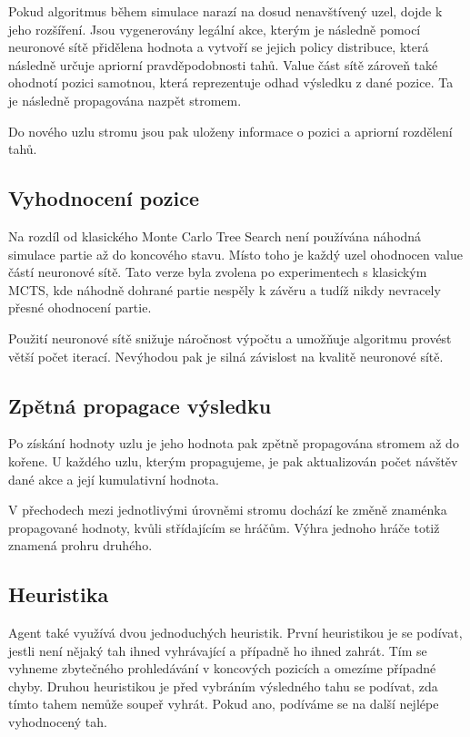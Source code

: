 Pokud algoritmus během simulace narazí na dosud nenavštívený uzel, dojde k jeho rozšíření. Jsou vygenerovány legální akce, kterým je následně pomocí 
neuronové sítě přidělena hodnota a vytvoří se jejich policy distribuce, která následně určuje apriorní pravděpodobnosti tahů. Value část sítě 
zároveň také ohodnotí pozici samotnou, která reprezentuje odhad výsledku z dané pozice. Ta je následně propagována nazpět stromem.

Do nového uzlu stromu jsou pak uloženy informace o pozici a apriorní rozdělení tahů.

\subsection{Vyhodnocení pozice}

Na rozdíl od klasického Monte Carlo Tree Search není používána náhodná simulace partie až do koncového stavu. Místo toho je každý uzel ohodnocen 
value částí neuronové sítě. Tato verze byla zvolena po experimentech s klasickým MCTS, kde náhodně dohrané partie nespěly k závěru a tudíž
nikdy nevracely přesné ohodnocení partie.

Použití neuronové sítě snižuje náročnost výpočtu a umožňuje algoritmu provést větší počet iterací. Nevýhodou pak je silná závislost na kvalitě
neuronové sítě. 

\subsection{Zpětná propagace výsledku}

Po získání hodnoty uzlu je jeho hodnota pak zpětně propagována stromem až do kořene. U každého uzlu, kterým propagujeme, je pak aktualizován
počet návštěv dané akce a její kumulativní hodnota.

V přechodech mezi jednotlivými úrovněmi stromu dochází ke změně znaménka propagované hodnoty, kvůli střídajícím se hráčům. Výhra jednoho hráče totiž znamená
prohru druhého.

\subsection{Heuristika}

Agent také využívá dvou jednoduchých heuristik. První heuristikou je se podívat, jestli není nějaký tah ihned vyhrávající a případně ho ihned zahrát.
Tím se vyhneme zbytečného prohledávání v koncových pozicích a omezíme případné chyby. Druhou heuristikou je před vybráním výsledného tahu se podívat,
zda tímto tahem nemůže soupeř vyhrát. Pokud ano, podíváme se na další nejlépe vyhodnocený tah.

